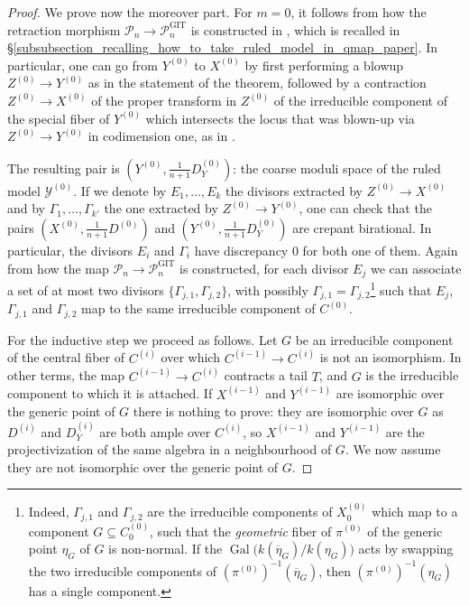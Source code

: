 \documentclass[a4paper,12pt]{amsart}
\DeclareMathOperator{\GIT}{GIT}
\newcommand{\sY}{{\mathscr{Y}}}
\newcommand{\sP}{{\mathscr{P}}}
\DeclareMathOperator{\Gal}{Gal}
\theoremstyle{definition}
\theoremstyle{remark}
\begin{document}
\begin{proof}
    We prove now the moreover part. For $m=0$, it follows from how the retraction morphism $\sP_n\to \sP_n^{\GIT}$ is constructed in \cite[Theorem A.4(1)]{twisted_map_2}, which is recalled in \S\ref{subsubsection_recalling_how_to_take_ruled_model_in_qmap_paper}. In particular, one can go from $Y^{(0)}$ to $X^{(0)}$ by first performing a blowup $Z^{(0)}\to Y^{(0)}$ as in the statement of the theorem, followed by
    a contraction $Z^{(0)}\to X^{(0)}$ of the proper transform in $Z^{(0)}$ of the irreducible component of the special fiber of $Y^{(0)}$ which intersects the locus that was blown-up via $Z^{(0)}\to Y^{(0)}$ in codimension one, as in .
    
    The resulting pair is $(Y^{(0)},\frac{1}{n+1}D_{Y}^{(0)})$: the coarse moduli space of the ruled model $\sY^{(0)}$. If we denote by $E_1,\ldots,E_k$ the divisors extracted by $Z^{(0)}\to X^{(0)}$ and by  $\Gamma_1,\ldots,\Gamma_{k'}$ the one extracted by $Z^{(0)}\to Y^{(0)}$, one can check that the pairs $(X^{(0)},\frac{1}{n+1}D^{(0)})$ and $(Y^{(0)},\frac{1}{n+1}D_{Y}^{(0)})$ are crepant birational. In particular, the divisors $E_i$ and $\Gamma_i$ have discrepancy 0 for both one of them. Again from how the map $\sP_n\to \sP_n^{\GIT}$ is constructed, for each divisor $E_j$ we can associate a set of at most two divisors $\{\Gamma_{j,1},\Gamma_{j,2}\}$, with possibly $\Gamma_{j,1}=\Gamma_{j,2}$\footnote{Indeed, $\Gamma_{j,1}$ and $\Gamma_{j,2}$ are the irreducible components of $X^{(0)}_0$ which map to a component $G\subseteq C^{(0)}_0$, such that the \textit{geometric} fiber of $\pi^{(0)}$ of the generic point $\eta_G$ of $G$ is non-normal. If the $\Gal\big(k(\overline{\eta}_G)/k(\eta_G)\big)$ acts by swapping the two irreducible components of $(\pi^{(0)})^{-1}(\overline{\eta}_G)$, then $(\pi^{(0)})^{-1}(\eta_G)$ has a single component.} such that $E_j$, $\Gamma_{j,1}$ and $\Gamma_{j,2}$ map to the same irreducible component of $C^{(0)}$.

    
    For the inductive step we proceed as follows. Let $G$ be an irreducible component of the central fiber of $C^{(i)}$ over which $C^{(i-1)}\to C^{(i)}$ is not an isomorphism. In other terms, the map  $C^{(i-1)}\to C^{(i)}$ contracts a tail $T$, and $G$ is the irreducible component to which it is attached. If $X^{(i-1)}$ and $Y^{(i-1)}$ are isomorphic over the generic point of $G$ there is nothing to prove: they are isomorphic over $G$ as $D^{(i)}$ and $D^{(i)}_Y$ are both ample over $C^{(i)}$, so $X^{(i-1)}$ and $Y^{(i-1)}$ are the projectivization of the same algebra in a neighbourhood of $G$. We now assume they are not isomorphic over the generic point of $G$. 
    

\end{proof}
\end{document}

